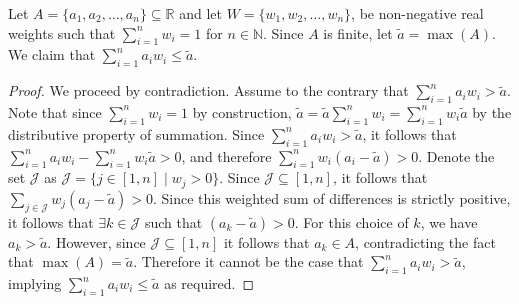 \documentclass[letterpaper,12pt]{article}
\begin{document}
	Let $A = \{a_1, a_2, \dots, a_n\} \subseteq \mathbb{R}$ and let $W = \{w_1, w_2, \dots, w_n\}$, be non-negative real weights such that $\sum_{i = 1}^n w_i = 1$ for $n \in \mathbb{N}$. Since $A$ is finite, let $\tilde{a}=\max(A)$. We claim that $\sum_{i = 1}^n a_i w_i \leq \tilde{a}$.
	\begin{proof}
		We proceed by contradiction. Assume to the contrary that $\sum_{i = 1}^n a_i w_i > \tilde{a}$. Note that since $\sum_{i = 1}^n w_i = 1$ by construction, $\tilde{a} = \tilde{a}\sum_{i = 1}^n w_i = \sum_{i = 1}^n w_i\tilde{a}$ by the distributive property of summation. Since $\sum_{i = 1}^n a_i w_i > \tilde{a}$, it follows that 
		$
	    \sum_{i = 1}^n a_i w_i -  \sum_{i = 1}^n w_i\tilde{a} > 0$, and therefore  $\sum_{i = 1}^n w_i (a_i - \tilde{a}) > 0$.
		Denote the set $\mathcal{J}$ as $\mathcal{J} = \{j \in [1,n] \mid w_j > 0\}$. Since $\mathcal{J} \subseteq [1,n]$, it follows that $\sum_{j \in \mathcal{J}} w_j (a_j - \tilde{a}) > 0$. Since this weighted sum of differences is strictly positive, it follows that $\exists k \in \mathcal{J}$ such that $(a_k - \tilde{a}) > 0$. For this choice of $k$, we have $a_k > \tilde{a}$. However, since $\mathcal{J} \subseteq [1,n]$ it follows that $a_k \in A$, contradicting the fact that $\max(A) = \tilde{a}$. Therefore it cannot be the case that $\sum_{i = 1}^n a_i w_i > \tilde{a}$, implying $\sum_{i = 1}^n a_i w_i \leq \tilde{a}$ as required.
	\end{proof} 
	
\end{document}
